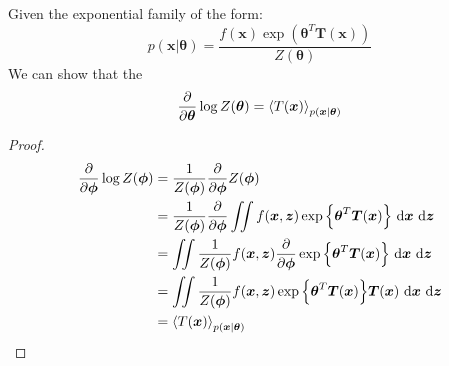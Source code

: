 \begin{proposition}
    Given the exponential family of the form:
    \begin{equation*}
        p(\boldsymbol x | \boldsymbol \theta) = \frac{f(\boldsymbol x)\exp(\boldsymbol \theta^T\boldsymbol T(\boldsymbol x))}{Z(\boldsymbol \theta)}
    \end{equation*}
    We can show that the 
    \begin{equation*}
        \frac{\partial}{\partial \boldsymbol \theta} \log Z(\boldsymbol \theta) = \left\langle T(\boldsymbol x) \right\rangle_{p(\boldsymbol x | \boldsymbol \theta)}
    \end{equation*}
\end{proposition}
\begin{proof}
    \begin{equation*}
    \begin{aligned}
        \frac{\partial}{\partial \boldsymbol \phi} \log Z(\boldsymbol \phi) &= \frac{1}{Z(\boldsymbol \phi)} \frac{\partial}{\partial \boldsymbol \phi} Z(\boldsymbol \phi) \\
        &= \frac{1}{Z(\boldsymbol \phi)} \frac{\partial}{\partial\boldsymbol \phi}\iint f(\boldsymbol x,\boldsymbol z)\exp\Big\{ \boldsymbol \theta^T \boldsymbol T(\boldsymbol x) \Big\}\ \mathrm{d} \boldsymbol x\ \mathrm{d}\boldsymbol z \\
        &= \iint \frac{1}{Z(\boldsymbol \phi)}  f(\boldsymbol x,\boldsymbol z)\frac{\partial}{\partial\boldsymbol \phi}\exp\Big\{\boldsymbol \theta^T\boldsymbol T(\boldsymbol x)\Big\}\ \mathrm{d} \boldsymbol x\ \mathrm{d}\boldsymbol z \\
        &= \iint \frac{1}{Z(\boldsymbol \phi)}  f(\boldsymbol x,\boldsymbol z)\exp\Big\{\boldsymbol \theta^T\boldsymbol T(\boldsymbol x)\Big\}\boldsymbol T(\boldsymbol x)\ \mathrm{d} \boldsymbol x\ \mathrm{d}\boldsymbol z \\
        &= \left\langle T(\boldsymbol x) \right\rangle_{p(\boldsymbol x| \boldsymbol \theta)}
    \end{aligned}
    \end{equation*}
\end{proof}

